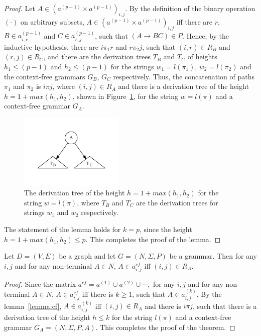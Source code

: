 \documentclass[runningheads,a4paper]{llncs}
\begin{document}
\begin{proof}
	Let $A \in (a^{(p-1)} \times a^{(p-1)})_{i,j}$. By the definition of the binary operation $(\cdot)$ on arbitrary subsets, $A \in (a^{(p-1)} \times a^{(p-1)})_{i,j}$ iff there are $r$, $B \in a^{(p-1)}_{i,r}$ and $C \in a^{(p-1)}_{r,j}$, such that $(A \rightarrow B C) \in P$. Hence, by the inductive hypothesis, there are $i \pi_1 r$ and $r \pi_2 j$, such that $(i,r) \in R_B$ and $(r,j) \in R_C$, and there are the derivation trees $T_B$ and $T_C$ of heights $h_1 \leq (p-1)$ and $h_2 \leq (p-1)$ for the strings $w_1 = l(\pi_1)$, $w_2 = l(\pi_2)$ and the context-free grammars $G_B$, $G_C$ respectively. Thus, the concatenation of paths $\pi_1$ and $\pi_2$ is $i \pi j$, where $(i,j) \in R_A$ and there is a derivation tree of the height $h = 1 + max(h_1, h_2)$, shown in Figure~\ref{tree2}, for the string $w = l(\pi)$ and a context-free grammar $G_A$.
	
	\begin{figure}[h!]
		\centering
		\includegraphics[width=5cm]{pictures/tree2.pdf}
		\caption{The derivation tree of the height $h = 1 + max(h_1, h_2)$ for the string $w = l(\pi)$, where $T_B$ and $T_C$ are the derivation trees for strings $w_1$ and $w_2$ respectively.}
		\label{tree2}
	\end{figure}
	
	The statement of the lemma holds for $k = p$, since the height $h = 1 + max(h_1, h_2) \leq p$. This completes the proof of the lemma.
\end{proof}

\begin{mytheorem}\label{thm:correct}
	Let $D = (V,E)$ be a graph and let $G =(N,\Sigma,P)$ be a grammar. Then for any $i, j$ and for any non-terminal $A \in N$, $A \in a^{cf}_{i,j}$ iff $(i,j) \in R_A$.
\end{mytheorem}
\begin{proof}
	
	Since the matrix $a^{cf} = a^{(1)} \cup a^{(2)} \cup \cdots,$ for any $i, j$ and for any non-terminal $A \in N$, $A \in a^{cf}_{i,j}$ iff there is $k \geq 1$, such that $A \in a^{(k)}_{i,j}$. By the lemma~\ref{lemma:cf}, $A \in a^{(k)}_{i,j}$ iff $(i,j) \in R_A$ and there is $i \pi j$, such that there is a derivation tree of the height $h \leq k$ for the string $l(\pi)$ and a context-free grammar $G_A = (N,\Sigma,P,A)$. This completes the proof of the theorem.
\end{proof}
\end{document}
